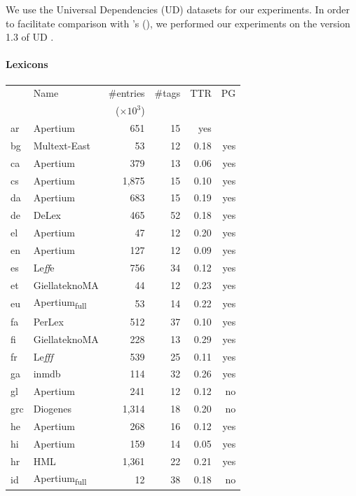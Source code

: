 \documentclass[11pt,a4paper]{article}
\begin{document}
We use the Universal Dependencies (UD) datasets for our experiments. In order to facilitate comparison with
\citeauthor{plank16}'s (\citeyear{plank16}), we performed our experiments on the version 1.3 of UD \cite{ud13}.

\paragraph{Lexicons}

\addtocounter{footnote}{-1}

\begin{table}[t]
\centering
\scriptsize
\begin{tabular}{llrr|rr}
\toprule
 & Name & \#entries & \#tags  & TTR & PG \\
 &  & ($\times 10^3$) &  &  &  \\
\midrule 
ar &   Apertium & 651 & 15 &  yes \\
bg & Multext-East & 53 &12 &  0.18 & yes \\
ca &  Apertium & 379 & 13 &  0.06 & yes \\
cs &  Apertium & 1,875 & 15 &  0.10 & yes \\
da & Apertium & 683 & 15 &  0.19 & yes \\
de & DeLex & 465 & 52 &  0.18 &yes\\
el & Apertium & 47 & 12 &  0.20 & yes \\
en & Apertium & 127 & 12 &  0.09& yes \\
es & Le{\it ff}e &  756 & 34 &  0.12 &yes\\
et & GiellateknoMA & 44 & 12 &  0.23 & yes \\
eu & Apertium\textsubscript{full} & 53 &  14 &  0.22 &  yes \\
fa  & PerLex &  512 & 37 &  0.10 & yes\\
fi & GiellateknoMA & 228 & 13 &  0.29 & yes \\
fr & Le{\it fff} & 539 & 25 & 0.11 &yes\\
ga & inmdb & 114 & 32 &  0.26& yes\\
gl & Apertium & 241 & 12 &  0.12 &no\\
grc  & Diogenes & 1,314 & 18 &  0.20 &no\\
he & Apertium & 268 & 16 &  0.12 & yes\\
hi & Apertium & 159 & 14 &  0.05 & yes\\
hr  & HML   & 1,361 & 22 &  0.21 & yes \\
id & Apertium\textsubscript{full}& 12 & 38 & 0.18 & no   \\

\end{tabular}
\end{table}
\end{document}
